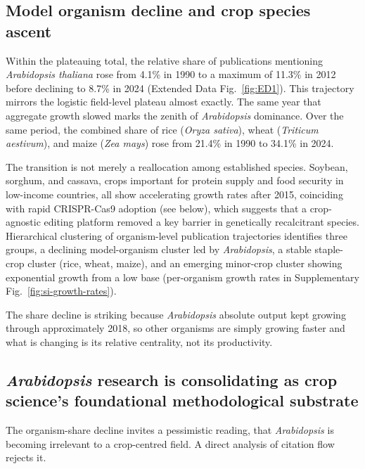 \subsection*{Model organism decline and crop species ascent}

Within the plateauing total, the relative share of publications mentioning
\textit{Arabidopsis thaliana} rose from 4.1\% in 1990 to a maximum of
11.3\% in 2012 before declining to 8.7\% in 2024 (Extended Data Fig.~\ref{fig:ED1}).
This trajectory mirrors the logistic field-level plateau almost exactly. The
same year that aggregate growth slowed marks the zenith of
\textit{Arabidopsis} dominance.
Over the same period, the combined share of rice (\textit{Oryza sativa}),
wheat (\textit{Triticum aestivum}), and maize (\textit{Zea mays}) rose from
21.4\% in 1990 to 34.1\% in 2024.

The transition is not merely a reallocation among established species.
Soybean, sorghum, and cassava, crops important for protein supply and food
security in low-income countries, all show accelerating growth rates after 2015,
coinciding with rapid CRISPR-Cas9 adoption (see below), which suggests that a
crop-agnostic editing platform removed a key barrier in genetically recalcitrant
species. Hierarchical clustering of organism-level publication trajectories
identifies three groups, a declining model-organism cluster led by
\textit{Arabidopsis}, a stable staple-crop cluster (rice, wheat, maize), and an
emerging minor-crop cluster showing exponential growth from a low base
(per-organism growth rates in Supplementary Fig.~\ref{fig:si-growth-rates}).

The share decline is striking because \textit{Arabidopsis} absolute output kept
growing through approximately 2018, so other organisms are simply growing faster
and what is changing is its relative centrality, not its productivity.


\subsection*{\textit{Arabidopsis} research is consolidating as crop science's foundational methodological substrate}

The organism-share decline invites a pessimistic reading, that
\textit{Arabidopsis} is becoming irrelevant to a crop-centred field. A direct
analysis of citation flow rejects it.

